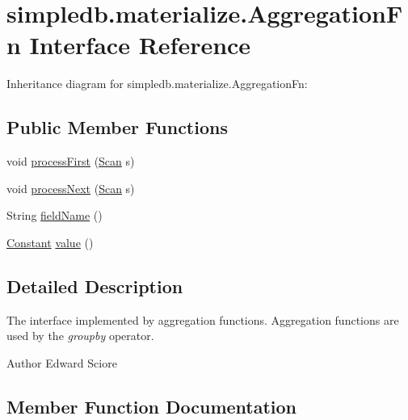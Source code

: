 \hypertarget{interfacesimpledb_1_1materialize_1_1AggregationFn}{}\section{simpledb.\+materialize.\+Aggregation\+Fn Interface Reference}
\label{interfacesimpledb_1_1materialize_1_1AggregationFn}


Inheritance diagram for simpledb.\+materialize.\+Aggregation\+Fn\+:
\subsection*{Public Member Functions}
\begin{DoxyCompactItemize}
\item 
void \hyperlink{interfacesimpledb_1_1materialize_1_1AggregationFn_abc424e0873445d14786ae0f3c539c80f}{process\+First} (\hyperlink{interfacesimpledb_1_1query_1_1Scan}{Scan} s)
\item 
void \hyperlink{interfacesimpledb_1_1materialize_1_1AggregationFn_ae2ff3fb2b1207eab18a70ecf8ffb98dc}{process\+Next} (\hyperlink{interfacesimpledb_1_1query_1_1Scan}{Scan} s)
\item 
String \hyperlink{interfacesimpledb_1_1materialize_1_1AggregationFn_a03cbdf13e41c3e6ea0b8a76863cd58cf}{field\+Name} ()
\item 
\hyperlink{classsimpledb_1_1query_1_1Constant}{Constant} \hyperlink{interfacesimpledb_1_1materialize_1_1AggregationFn_a65957d8075e508ef5555e3bf6ba16184}{value} ()
\end{DoxyCompactItemize}


\subsection{Detailed Description}
The interface implemented by aggregation functions. Aggregation functions are used by the {\itshape groupby} operator. \begin{DoxyAuthor}{Author}
Edward Sciore 
\end{DoxyAuthor}


\subsection{Member Function Documentation}
\mbox{\label{interfacesimpledb_1_1materialize_1_1AggregationFn_a03cbdf13e41c3e6ea0b8a76863cd58cf}} 
